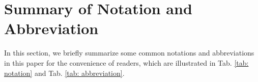 \documentclass[nohyperref]{article}
\theoremstyle{plain}
\begin{document}
\nocite{langley00}





\newpage
\appendix
\onecolumn




\iffalse
1. 方法的核心部分其实并没有直观的写出策略多样性的定义
保证讲清楚，讲明了。明确每一个部分的具体内容和实际表现。
\fi




\section{Summary of Notation and Abbreviation}
\label{app: Abbreviation and Notation}
In this section, we briefly summarize some common notations and abbreviations in this paper for the convenience of readers, which are illustrated in Tab. \ref{tab: notation} and Tab. \ref{tab: abbreviation}.
\end{document}
